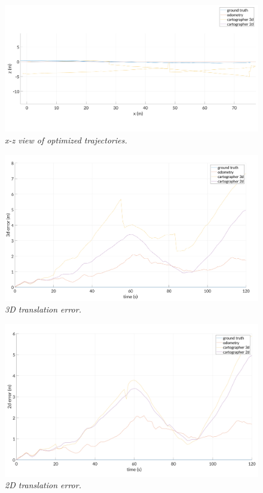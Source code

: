 \begin{figure}[hbt!]
    \centering
    \includegraphics[width = 0.8\linewidth]{media/cartographer/error-side.png}
    \caption{\textit{x-z view of optimized trajectories.}}
    \label{fig:cartographer-xz}
\end{figure}

\begin{figure}[hbt!]
    \centering
    \includegraphics[width = 0.8\linewidth]{media/cartographer/3d-translation-error.png}
    \caption{\textit{3D translation error.}}
    \label{fig:cartographer-3d-error}
\end{figure}

\begin{figure}[hbt!]
    \centering
    \includegraphics[width = 0.8\linewidth]{media/cartographer/2d-translation-error.png}
    \caption{\textit{2D translation error.}}
    \label{fig:cartographer-2d-error}
\end{figure}


